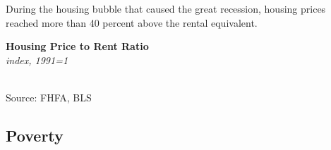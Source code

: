 \documentclass{report}
\makeatletter
\newcommand{\tbllink}[1]{\href{https://raw.githubusercontent.com/bdecon/US-chartbook/master/chartbook/data/#1}{\faTable}}
\newcommand*\short[1]{\expandafter\@gobbletwo\number\numexpr#1\relax}
\newcommand{\shdateaxisticks}{
		date coordinates in=x, axis line style={draw=none},
		xmax={2023-02-15},
		max space between ticks=40,	    
		xtick={{1990-01-01}, {1995-01-01}, {2000-01-01}, 
			{2005-01-01}, {2010-01-01}, {2015-01-01}, {2020-01-01}},
		minor xtick={},
		enlarge y limits={0.06}, enlarge x limits={0.01},
		}
\newcommand{\bbar}[2]{extra #1 ticks = {{#2}}, extra #1 tick labels = ,
		extra #1 tick style = {grid=major, grid style={thick, black!25}},}
\newcommand{\stdline}[4]{\addplot[very thick, no markers, color=#1] 
		table [x=#2, y=#3, col sep=comma] {#4};	}
\newcommand{\rebars}{
		\fill[color=black!10] (axis cs:{2007-12-01},\pgfkeysvalueof{/pgfplots/ymin}) rectangle 
			(axis cs:{2009-07-01}, \pgfkeysvalueof{/pgfplots/ymax});
		\fill[color=black!10] (axis cs:{2001-03-01},\pgfkeysvalueof{/pgfplots/ymin}) rectangle 
			(axis cs:{2001-11-01}, \pgfkeysvalueof{/pgfplots/ymax});
		\fill[color=black!10] (axis cs:{2020-02-01},\pgfkeysvalueof{/pgfplots/ymin}) rectangle 
			(axis cs:{2020-05-01}, \pgfkeysvalueof{/pgfplots/ymax});}
\makeatother
\begin{document}
{\begin{minipage}{0.33\textwidth}
During the housing bubble that caused the great recession, housing prices reached more than 40 percent above the rental equivalent. 
\end{minipage}\hspace{8mm}
\begin{minipage}{0.37\textwidth}
\normalsize \textbf{Housing Price to Rent Ratio}\\
\footnotesize{\textit{index, 1991=1}}\\
\hspace*{-2mm} \\
\footnotesize{Source: FHFA, BLS} \hfill \tbllink{hpi_rent_ratio.csv} 
\end{minipage}
\newpage
\begin{minipage}{0.76\textwidth}
\subsection*{Poverty}
\hypertarget{hhpov}{}
\small 


\end{minipage}}
\end{document}
